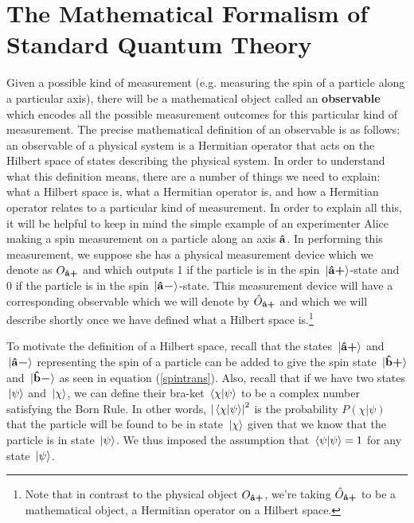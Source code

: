 \section{The Mathematical Formalism of Standard Quantum Theory}
Given a possible kind of measurement (e.g. measuring the spin of a particle along a particular axis), there will be a mathematical object called an \textbf{observable} which encodes all the possible measurement outcomes for this particular kind of measurement. The precise mathematical definition of an observable is as follows: an observable of a physical system is a Hermitian operator that acts on the Hilbert space of states describing the physical system. In order to understand what this definition means, there are a number of things we need to explain: what a Hilbert space is, what a Hermitian operator is, and how a Hermitian operator relates to a particular kind of measurement. In order to explain all this, it will be helpful to keep in mind the simple example of an experimenter Alice making a spin measurement on a particle along an axis $\vb{\hat{{a}}}$. In performing this measurement, we suppose she has a physical measurement device which we denote as $O_{{\vb{\hat{{a}}}\bm{+}}}$ %
%
and which outputs 1 if the particle is in the spin $\ket*{{\vb{\hat{{a}}}\bm{+}}}$-state and 0 if the particle is in the spin $\ket*{{\vb{\hat{{a}}}\bm{-}}}$-state. This measurement device will have a corresponding observable which we will denote by $\hat{O}_{{\vb{\hat{{a}}}\bm{+}}}$ %
%
and which we will describe shortly once we have defined { what a Hilbert space is.\footnote{Note that in contrast to the physical object $O_{{\vb{\hat{{a}}}\bm{+}}}$, we're taking $\hat{O}_{{\vb{\hat{{a}}}\bm{+}}}$ to be a mathematical object, a Hermitian operator on a Hilbert space.} } 

To motivate the definition of a Hilbert space, recall that the states $\ket*{{\vb{\hat{{a}}}\bm{+}}}$ and $\ket*{{\vb{\hat{{a}}}\bm{-}}}$ representing the spin of  a particle can be added to give the spin state $\ket*{{\vb{\hat{{b}}}\bm{+}}}$ and $\ket*{{\vb{\hat{{b}}}\bm{-}}}$ as seen in equation (\ref{spintrans}). Also, recall that if we have two states $\ket*{\psi}$ and $\ket*{\chi}$, we can define their bra-ket $\ip*{\chi}{\psi}$ to be a complex number satisfying the Born Rule. In other words, $\abs{\ip*{\chi}{\psi}}^2$ is the probability $P(\chi|\psi)$ that the particle will be found to be in state $\ket*{\chi}$ given that we know that the particle is in state $\ket*{\psi}$. We thus imposed the assumption that  $\ip*{\psi}{\psi}=1$ for any state $\ket*{\psi}$. 

